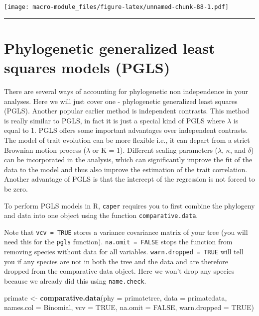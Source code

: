 \documentclass[]{book}
\newenvironment{Shaded}{\begin{snugshade}}{\end{snugshade}}
\newcommand{\KeywordTok}[1]{\textcolor[rgb]{0.13,0.29,0.53}{\textbf{{#1}}}}
\newcommand{\DataTypeTok}[1]{\textcolor[rgb]{0.13,0.29,0.53}{{#1}}}
\newcommand{\StringTok}[1]{\textcolor[rgb]{0.31,0.60,0.02}{{#1}}}
\newcommand{\OtherTok}[1]{\textcolor[rgb]{0.56,0.35,0.01}{{#1}}}
\newcommand{\NormalTok}[1]{{#1}}
\begin{document}
\texttt{[image: macro-module\_files/figure-latex/unnamed-chunk-88-1.pdf]}

\begin{center}\rule{0.5\linewidth}{\linethickness}\end{center}

\section{Phylogenetic generalized least squares models
(PGLS)}\label{phylogenetic-generalized-least-squares-models-pgls}

There are several ways of accounting for phylogenetic non independence
in your analyses. Here we will just cover one - phylogenetic generalized
least squares (PGLS). Another popular earlier method is independent
contrasts. This method is really similar to PGLS, in fact it is just a
special kind of PGLS where \(\lambda\) is equal to 1. PGLS offers some
important advantages over independent contrasts. The model of trait
evolution can be more flexible i.e., it can depart from a strict
Brownian motion process (\(\lambda\) or K = 1). Different scaling
parameters (\(\lambda\), \(\kappa\), and \(\delta\)) can be incorporated
in the analysis, which can significantly improve the fit of the data to
the model and thus also improve the estimation of the trait correlation.
Another advantage of PGLS is that the intercept of the regression is not
forced to be zero.

To perform PGLS models in R, \texttt{caper} requires you to first
combine the phylogeny and data into one object using the function
\texttt{comparative.data}.

Note that \texttt{vcv\ =\ TRUE} stores a variance covariance matrix of
your tree (you will need this for the \texttt{pgls} function).
\texttt{na.omit\ =\ FALSE} stops the function from removing species
without data for all variables. \texttt{warn.dropped\ =\ TRUE} will tell
you if any species are not in both the tree and the data and are
therefore dropped from the comparative data object. Here we won't drop
any species because we already did this using \texttt{name.check}.

\begin{Shaded}
\begin{Highlighting}[]
\NormalTok{primate <-}\StringTok{ }\KeywordTok{comparative.data}\NormalTok{(}\DataTypeTok{phy =} \NormalTok{primatetree, }\DataTypeTok{data =} \NormalTok{primatedata, }
                            \DataTypeTok{names.col =} \NormalTok{Binomial, }\DataTypeTok{vcv =} \OtherTok{TRUE}\NormalTok{, }
                            \DataTypeTok{na.omit =} \OtherTok{FALSE}\NormalTok{, }\DataTypeTok{warn.dropped =} \OtherTok{TRUE}\NormalTok{)}
\end{Highlighting}
\end{Shaded}
\end{document}
